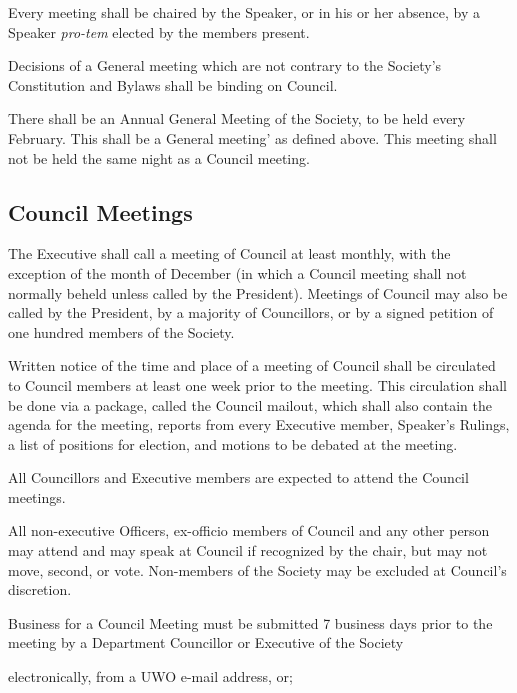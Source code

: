 \begin{longenum}[ label*=\thesubsection.\arabic*., align=left]
    \item Every meeting shall be chaired by the Speaker, or in his or her absence, by a Speaker  \textit{pro-tem} elected by the members present.
    \item Decisions of a General meeting which are not contrary to the Society's Constitution and Bylaws shall be binding on Council.
    \item There shall be an Annual General Meeting of the Society, to be held every February. This shall be a General  meeting' as defined above. This meeting  shall not be held the same night as a Council meeting. 
\end{longenum}
\subsection{Council Meetings}
\begin{longenum}[ label*=\thesubsection.\arabic*., align=left]
	\item The Executive shall call a meeting of Council at least monthly, with the exception of the month of December (in which a Council meeting shall not normally beheld unless called by the President).  Meetings of Council may also be called by the President, by a majority of Councillors, or by a signed petition of one hundred members of the Society.
    \item Written notice of the time and place of a meeting of Council shall be circulated to Council members at least one week prior to the meeting. This circulation shall be done via a package, called the Council mailout, which shall also contain the agenda for the meeting, reports from every Executive member, Speaker's Rulings, a list of positions for election, and motions to be debated at the meeting.
    \item All Councillors and Executive members are expected to attend the Council meetings. 
    \item All non-executive Officers, ex-officio members of Council and any other person may attend and may speak at Council if recognized by the chair, but may not move, second, or vote. Non-members of the Society may be excluded at Council's discretion. 
    \item Business for a Council Meeting must be submitted 7 business days prior to the meeting by a Department Councillor or Executive of the Society
	\begin{longenum}[ label*=\arabic*., align=left]
		\item electronically, from a UWO e-mail address, or;

\end{longenum}
\end{longenum}
